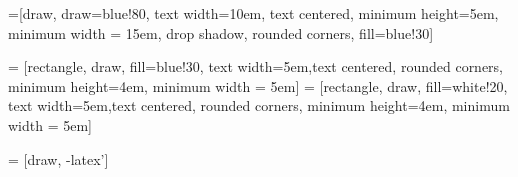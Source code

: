 \newcommand\setrow[3]{
  \setcounter{col}{1}
  \foreach \n in {#1, #2, #3} {
    \edef\x{\value{col} - 0.5}
    \edef\y{3.5 - \value{row}}
    \node[anchor=center] at (\x, \y) {\n};
    \stepcounter{col}
  }
  \stepcounter{row}
}

%  
=[draw, draw=blue!80, text width=10em, 
    text centered, minimum height=5em, minimum width = 15em, drop shadow, rounded corners,
    fill=blue!30]
    
 = [rectangle, draw, fill=blue!30, 
     text width=5em,text centered, rounded corners, minimum height=4em, minimum width = 5em]
 = [rectangle, draw, fill=white!20, 
     text width=5em,text centered, rounded corners, minimum height=4em, minimum width = 5em]

 = [draw, -latex']

\def\blockdist{1}
\def\edgedist{1.5}
  
